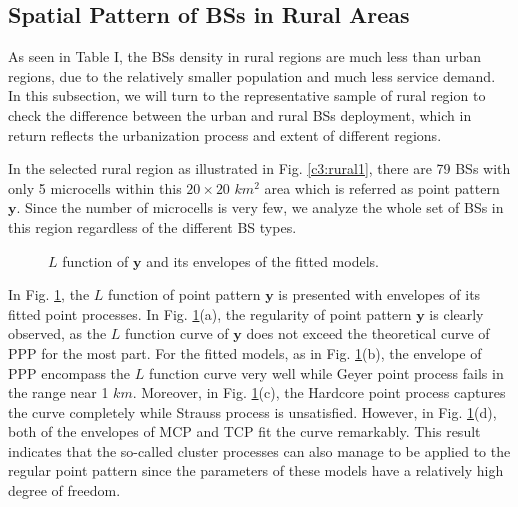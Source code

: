 \subsection*{Spatial Pattern of BSs in Rural Areas}
As seen in Table I, the BSs density in rural regions are much less than urban regions, due to the relatively smaller population and much less service demand. In this subsection, we will turn to the representative sample of rural region to check the difference between the urban and rural BSs deployment, which in return reflects the urbanization process and extent of different regions.

In the selected rural region as illustrated in Fig. \ref{c3:rural1}, there are 79 BSs with only 5 microcells within this $20\times20$ $km^2$ area which is referred as point pattern $\mathbf{y}$. Since the number of microcells is very few, we analyze the whole set of BSs in this region regardless of the different BS types.

\begin{figure} [!htb]
\centering
 \hspace{1in}
\caption{$L$ function of $\mathbf{y}$ and its envelopes of the fitted models. }
\label{fig:rural1_l}
\end{figure}

In Fig. \ref{fig:rural1_l}, the $L$ function of point pattern $\mathbf{y}$ is presented with envelopes of its fitted point processes. In Fig. \ref{fig:rural1_l}(a), the regularity of point pattern $\mathbf{y}$ is clearly observed, as the $L$ function curve of $\mathbf{y}$ does not exceed the theoretical curve of PPP for the most part. For the fitted models, as in Fig. \ref{fig:rural1_l}(b), the envelope of PPP encompass the $L$ function curve very well while Geyer point process fails in the range near 1 $km$. Moreover, in Fig. \ref{fig:rural1_l}(c), the Hardcore point process captures the curve completely while Strauss process is unsatisfied. However, in Fig. \ref{fig:rural1_l}(d), both of the envelopes of MCP and TCP fit the curve remarkably. This result indicates that the so-called cluster processes can also manage to be applied to the regular point pattern since the parameters of these models have a relatively high degree of freedom.

